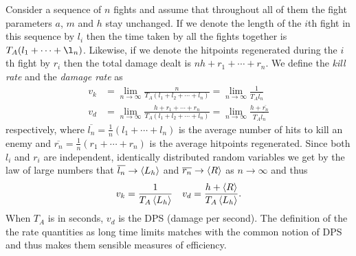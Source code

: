 Consider a sequence of $n$ fights and assume that throughout all of them the fight parameters $a$, $m$ and $h$ stay unchanged. If we denote the length of the $i$th fight in this sequence by $l_i$ then the time taken by all the fights together is $T_A(l_1+\cdots+\l_n)$. Likewise, if we denote the hitpoints regenerated during the $i$th fight by $r_i$ then the total damage dealt is $nh + r_1+\cdots+r_n$.
We define the \emph{kill rate} and the \emph{damage rate} as
\begin{align}
	v_k &= \lim\limits_{n\rightarrow\infty} \frac{n}{T_A(l_1 + l_2 + \cdots + l_n)}
		= \lim\limits_{n\rightarrow\infty} \frac{1}{T_A\overline{l_n}}\\
	v_d &= \lim\limits_{n\rightarrow\infty} \frac{h+r_1+\cdots+r_n}{T_A(l_1 + l_2 + \cdots + l_n)}
		= \lim\limits_{n\rightarrow\infty} \frac{h+\overline{r_n}}{T_A\overline{l_n}}
\end{align}
respectively, where $\overline{l_n} = \frac{1}{n}(l_1+\cdots+l_n)$ is the average number of hits to kill an enemy and $\overline{r_n} = \frac{1}{n}(r_1+\cdots+r_n)$ is the average hitpoints regenerated. Since both $l_i$ and $r_i$ are independent, identically distributed random variables we get by the law of large numbers that $\overline{l_n} \rightarrow \left\langle L_h \right\rangle$ and $\overline{r_n} \rightarrow \left\langle R \right\rangle$ as $n\rightarrow\infty$ and thus
\begin{align}
	v_k = \frac{1}{T_A\left\langle L_h \right\rangle} \quad v_d = \frac{h + \left\langle R \right\rangle}{T_A\left\langle L_h \right\rangle}.\label{eq:dps}
\end{align}
When $T_A$ is in seconds, $v_d$ is the DPS (damage per second). The definition of the the rate quantities as long time limits matches with the common notion of DPS and thus makes them sensible measures of efficiency.
